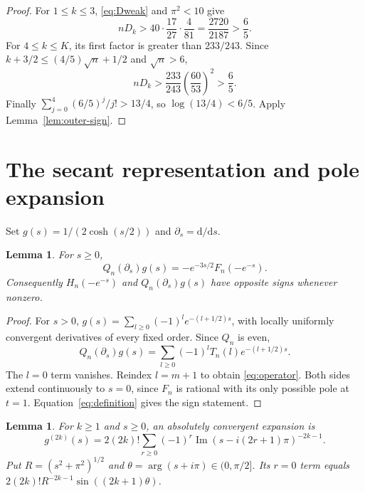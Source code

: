 \documentclass[11pt,letterpaper]{article}
\numberwithin{equation}{section}
\newtheorem{lemma}[theorem]{Lemma}
\newcommand{\ImPart}{\operatorname{Im}}
\begin{document}
\begin{proof}
For $1\le k\le3$, \eqref{eq:Dweak} and $\pi^2<10$ give
\[
 nD_k>40\cdot\frac{17}{27}\cdot\frac4{81}=\frac{2720}{2187}>\frac65.
\]
For $4\le k\le K$, its first factor is greater than $233/243$. Since $k+3/2\le(4/5)\sqrt n+1/2$ and $\sqrt n>6$,
\[
 nD_k>\frac{233}{243}\left(\frac{60}{53}\right)^2>\frac65.
\]
Finally $\sum_{j=0}^4(6/5)^j/j!>13/4$, so $\log(13/4)<6/5$. Apply Lemma~\ref{lem:outer-sign}.
\end{proof}

\section{The secant representation and pole expansion}\label{sec:poles}
Set $g(s)=1/(2\cosh(s/2))$ and $\partial_s=\mathrm d/\mathrm ds$.
\begin{lemma}\label{lem:operator}
For $s\ge0$,
\begin{equation}\label{eq:operator}
 Q_n(\partial_s)g(s)=-e^{-3s/2}F_n(-e^{-s}).
\end{equation}
Consequently $H_n(-e^{-s})$ and $Q_n(\partial_s)g(s)$ have opposite signs whenever nonzero.
\end{lemma}
\begin{proof}
For $s>0$, $g(s)=\sum_{l\ge0}(-1)^le^{-(l+1/2)s}$, with locally uniformly convergent derivatives of every fixed order. Since $Q_n$ is even,
\[
 Q_n(\partial_s)g(s)=\sum_{l\ge0}(-1)^lT_n(l)e^{-(l+1/2)s}.
\]
The $l=0$ term vanishes. Reindex $l=m+1$ to obtain \eqref{eq:operator}. Both sides extend continuously to $s=0$, since $F_n$ is rational with its only possible pole at $t=1$. Equation~\eqref{eq:definition} gives the sign statement.
\end{proof}
\begin{lemma}\label{lem:poles}
For $k\ge1$ and $s\ge0$, an absolutely convergent expansion is
\begin{equation}\label{eq:poles}
 g^{(2k)}(s)=2(2k)!\sum_{r\ge0}(-1)^r
 \ImPart(s-i(2r+1)\pi)^{-2k-1}.
\end{equation}
Put $R=(s^2+\pi^2)^{1/2}$ and $\theta=\arg(s+i\pi)\in(0,\pi/2]$. Its $r=0$ term equals $2(2k)!R^{-2k-1}\sin((2k+1)\theta)$.
\end{lemma}
\end{document}
